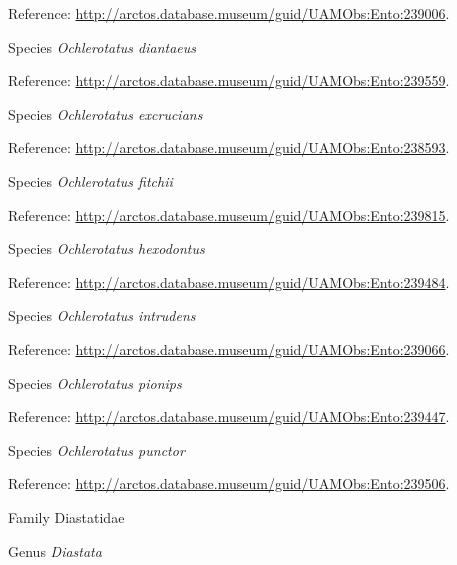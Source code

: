 \documentclass[9pt, article]{memoir}
\begin{document}
\begin{multicols}{2}
Reference: 
\url{http://arctos.database.museum/guid/UAMObs:Ento:239006}.

\vspace{6pt}\noindent\hspace{36pt}Species \textit{Ochlerotatus diantaeus}


Reference: 
\url{http://arctos.database.museum/guid/UAMObs:Ento:239559}.

\vspace{6pt}\noindent\hspace{36pt}Species \textit{Ochlerotatus excrucians}


Reference: 
\url{http://arctos.database.museum/guid/UAMObs:Ento:238593}.

\vspace{6pt}\noindent\hspace{36pt}Species \textit{Ochlerotatus fitchii}


Reference: 
\url{http://arctos.database.museum/guid/UAMObs:Ento:239815}.

\vspace{6pt}\noindent\hspace{36pt}Species \textit{Ochlerotatus hexodontus}


Reference: 
\url{http://arctos.database.museum/guid/UAMObs:Ento:239484}.

\vspace{6pt}\noindent\hspace{36pt}Species \textit{Ochlerotatus intrudens}


Reference: 
\url{http://arctos.database.museum/guid/UAMObs:Ento:239066}.

\vspace{6pt}\noindent\hspace{36pt}Species \textit{Ochlerotatus pionips}


Reference: 
\url{http://arctos.database.museum/guid/UAMObs:Ento:239447}.

\vspace{6pt}\noindent\hspace{36pt}Species \textit{Ochlerotatus punctor}


Reference: 
\url{http://arctos.database.museum/guid/UAMObs:Ento:239506}.

\vspace{6pt}\noindent\hspace{24pt}Family Diastatidae


\vspace{6pt}\noindent\hspace{30pt}Genus \textit{Diastata}



\end{multicols}
\end{document}
